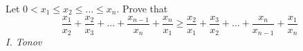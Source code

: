 Let $0<x_1\le x_2\le\ldots\le x_n$. Prove that
$$\frac{x_1}{x_2}+\frac{x_2}{x_3}+\ldots+\frac{x_{n-1}}{x_n}+\frac{x_n}{x_1}\ge\frac{x_2}{x_1}+\frac{x_3}{x_2}+\ldots+\frac{x_n}{x_{n-1}}+\frac{x_1}{x_n}$$
\textit{I. Tonov}